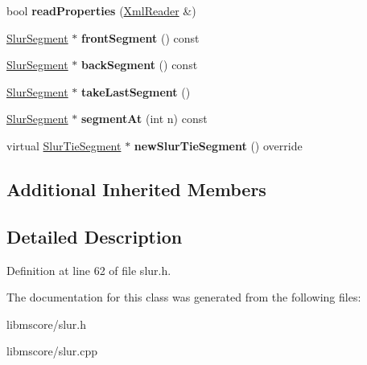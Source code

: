 \begin{DoxyCompactItemize}
\item 
\mbox{\label{class_ms_1_1_slur_a4b1940a2d12c731001065984e04a9587}} 
bool {\bfseries read\+Properties} (\hyperlink{class_ms_1_1_xml_reader}{Xml\+Reader} \&)
\item 
\mbox{\label{class_ms_1_1_slur_a76509099250a33be7cbe1e68ee5c8913}} 
\hyperlink{class_ms_1_1_slur_segment}{Slur\+Segment} $\ast$ {\bfseries front\+Segment} () const
\item 
\mbox{\label{class_ms_1_1_slur_ae208756e455b702ee75f9f86269b22b0}} 
\hyperlink{class_ms_1_1_slur_segment}{Slur\+Segment} $\ast$ {\bfseries back\+Segment} () const
\item 
\mbox{\label{class_ms_1_1_slur_a3fd34ec99fbed60812fd3190b38b1acc}} 
\hyperlink{class_ms_1_1_slur_segment}{Slur\+Segment} $\ast$ {\bfseries take\+Last\+Segment} ()
\item 
\mbox{\label{class_ms_1_1_slur_ab5f95d9efdc43a27f3bd6f939204619c}} 
\hyperlink{class_ms_1_1_slur_segment}{Slur\+Segment} $\ast$ {\bfseries segment\+At} (int n) const
\item 
\mbox{\label{class_ms_1_1_slur_a893bb0b4871c271ac19d741bde804622}} 
virtual \hyperlink{class_ms_1_1_slur_tie_segment}{Slur\+Tie\+Segment} $\ast$ {\bfseries new\+Slur\+Tie\+Segment} () override
\end{DoxyCompactItemize}
\subsection*{Additional Inherited Members}


\subsection{Detailed Description}


Definition at line 62 of file slur.\+h.



The documentation for this class was generated from the following files\+:\begin{DoxyCompactItemize}
\item 
libmscore/slur.\+h\item 
libmscore/slur.\+cpp\end{DoxyCompactItemize}
